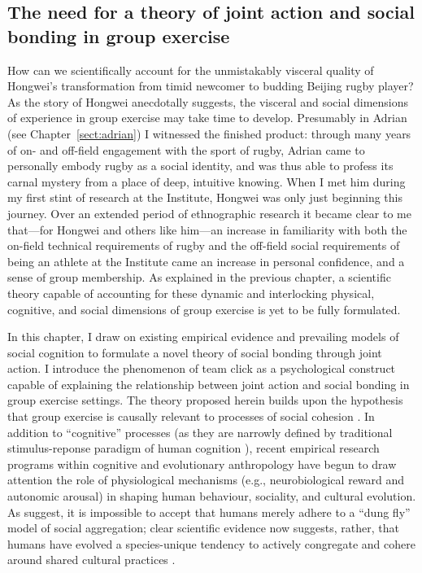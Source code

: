 \begin{CJK}{UTF8}{gbsn}
\section{The need for a theory of joint action and social bonding in group exercise}

How can we scientifically account for the unmistakably visceral quality of Hongwei's transformation from timid newcomer to budding Beijing rugby player?  As the story of Hongwei anecdotally suggests, the visceral and social dimensions of experience in group exercise may take time to develop.  Presumably in Adrian (see Chapter~\ref{sect:adrian}) I witnessed the finished product: through many years of on- and off-field engagement with the sport of rugby, Adrian came to personally embody rugby as a social identity, and was thus able to profess its carnal mystery from a place of deep, intuitive knowing.  When I met him during my first stint of research at the Institute, Hongwei was only just beginning this journey.  Over an extended period of ethnographic research it became clear to me that---for Hongwei and others like him---an increase in familiarity with both the on-field technical requirements of rugby and the off-field social requirements of being an athlete at the Institute came an increase in personal confidence, and a sense of group membership.  As explained in the previous chapter, a scientific theory capable of accounting for these dynamic and interlocking physical, cognitive, and social dimensions of group exercise is yet to be fully formulated.

In this chapter, I draw on existing empirical evidence and prevailing models of social cognition to formulate a novel theory of social bonding through joint action.  I introduce the phenomenon of team click as a psychological construct capable of explaining the relationship between joint action and social bonding in group exercise settings.  The theory proposed herein builds upon the hypothesis that group exercise is causally relevant to processes of social cohesion \citep{Dunbar2010,Whitehouse2014,Cohen2017}. In addition to ``cognitive'' processes (as they are narrowly defined by traditional stimulus-reponse paradigm of human cognition \citep[e.g.][]{Marr1985}), recent empirical research programs within cognitive and evolutionary anthropology have begun to draw attention the role of physiological mechanisms (e.g., neurobiological reward and autonomic arousal) in shaping human behaviour, sociality, and cultural evolution.  As \textcite{Dunbar2010} suggest, it is impossible to accept that humans merely adhere to a ``dung fly'' model of social aggregation; clear scientific evidence now suggests, rather, that humans have evolved a species-unique tendency to actively congregate and cohere around shared cultural practices \citep[see][]{Tomasello2005}.


\end{CJK}
